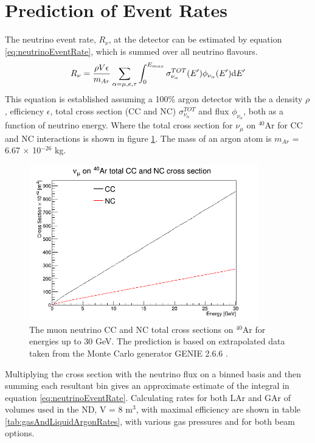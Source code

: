 \section{Prediction of Event Rates}
The neutrino event rate, $R_{\nu}$, at the detector can be estimated by equation \ref{eq:neutrinoEventRate}, which is summed over all neutrino flavours.
\begin{equation}
	R_{\nu} =  \frac{\rho V\epsilon}{m_{Ar}} \sum_{\alpha = \mu,e,\tau} \int_0^{E_{max}} \sigma^{TOT}_{\nu_{\alpha}}(E') \phi_{\nu_{\alpha}}(E') \hfill \mathrm{d}E'
	\label{eq:neutrinoEventRate}
\end{equation}
This equation is established assuming a 100\% argon detector with the a density $\rho$, efficiency $\epsilon$, total cross section (CC and NC) $\sigma^{TOT}_{\nu_{\alpha}}$ and flux $\phi_{\nu_{\alpha}}$, both as a function of neutrino energy. Where the total cross section for $\nu_{\mu}$ on $^{40}$Ar for CC and NC interactions is shown in figure \ref{fig:numuArgonCrossSection}. The mass of an argon atom is $m_{Ar}$ = 6.67 $\times$ 10$^{-26}$ kg.
\begin{figure}[hbtp]
	\begin{center}
		\includegraphics[width=100mm]{Chapter3/figures/numuAr40XSec_totalCCandNC.png}
	\caption{The muon neutrino CC and NC total cross sections on $^{40}$Ar for energies up to 30 GeV. The prediction is based on extrapolated data taken from the Monte Carlo generator GENIE 2.6.6 \cite{GENIE}. }
	\label{fig:numuArgonCrossSection}
\end{center}
\end{figure}

Multiplying the cross section with the neutrino flux on a binned basis and then summing each resultant bin gives an approximate estimate of the integral in equation \ref{eq:neutrinoEventRate}. Calculating rates for both LAr and GAr of volumes used in the ND, V = 8 m$^{3}$, with maximal efficiency are shown in table \ref{tab:gasAndLiquidArgonRates}, with various gas pressures and for both beam options.

